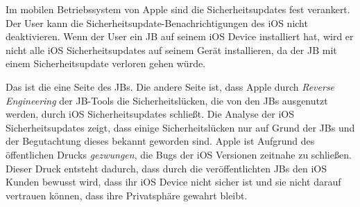  Im mobilen Betriebssystem von Apple sind die Sicherheitsupdates fest verankert. Der User kann die Sicherheitsupdate-Benachrichtigungen des iOS nicht deaktivieren. Wenn der User ein JB auf seinem iOS Device installiert hat, wird er nicht alle iOS Sicherheitsupdates auf seinem Gerät installieren, da der JB mit einem Sicherheitsupdate verloren gehen würde.\par 
Das ist die eine Seite des JBs. Die andere Seite ist, dass Apple durch \textit{\glqq Reverse Engineering\grqq{}} der JB-Tools die Sicherheitslücken, die von den JBs ausgenutzt werden, durch iOS Sicherheitsupdates schließt. Die Analyse der iOS Sicherheitsupdates zeigt, dass einige Sicherheitslücken nur auf Grund der JBs und der Begutachtung dieses bekannt geworden sind. Apple ist Aufgrund des öffentlichen Drucks \textit{\glqq gezwungen\grqq{}}, die Bugs der iOS Versionen zeitnahe zu schließen. Dieser Druck entsteht dadurch, dass durch die veröffentlichten JBs den iOS Kunden bewusst wird, dass ihr iOS Device nicht sicher ist und sie nicht darauf vertrauen können, dass ihre Privatsphäre gewahrt bleibt.


